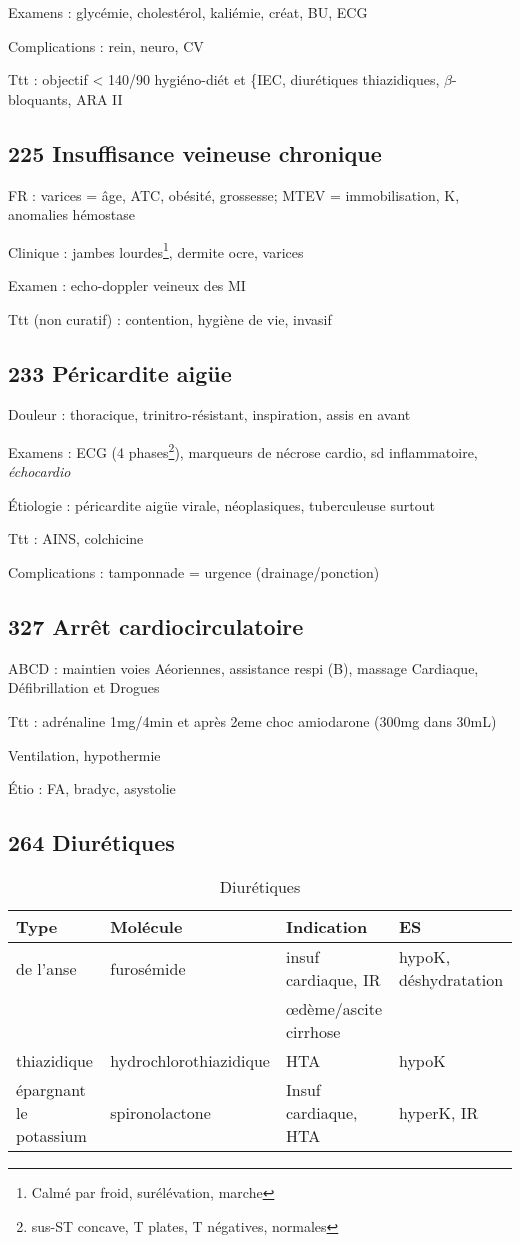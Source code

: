 \documentclass[11pt]{article}
\begin{document}
Examens : glycémie, cholestérol, kaliémie, créat, BU, ECG

Complications : rein, neuro, CV

Ttt : objectif < 140/90 \thus hygiéno-diét et \{IEC, diurétiques thiazidiques, \(\beta\)-bloquants, ARA II
\subsection{225 Insuffisance veineuse chronique}
\label{sec:orgb390963}
FR : varices = âge, ATC, obésité, grossesse; MTEV = immobilisation, K, anomalies hémostase

Clinique : jambes lourdes\footnote{Calmé par froid, surélévation, marche}, dermite ocre, varices

Examen : echo-doppler veineux des MI   

Ttt (non curatif) : contention, hygiène de vie, invasif
\subsection{233 Péricardite aigüe}
\label{sec:orgd1e63e4}
Douleur : thoracique, trinitro-résistant, \inc inspiration, \dec assis en avant

Examens : ECG (4 phases\footnote{sus-ST concave, T plates, T négatives, normales}), marqueurs de nécrose cardio, sd inflammatoire, \emph{échocardio}

Étiologie : péricardite aigüe virale, néoplasiques, tuberculeuse surtout

Ttt : AINS, colchicine

Complications : tamponnade = urgence \faBomb (drainage/ponction)
\subsection{327 Arrêt cardiocirculatoire}
\label{sec:org48763ab}
ABCD : maintien voies Aéoriennes, assistance respi (B), massage Cardiaque,
Défibrillation et Drogues

Ttt : adrénaline 1mg/4min et après 2eme choc amiodarone (300mg dans 30mL)

Ventilation, hypothermie

Étio : FA, bradyc, asystolie
\subsection{264 Diurétiques}
\label{sec:org56886c2}
\begin{table}[htbp]
\caption{Diurétiques}
\centering
\begin{tabular}{llll}
Type & Molécule & Indication & ES\\
\hline
de l'anse & furosémide & insuf cardiaque, IR & hypoK, déshydratation\\
 &  & \oe{}dème/ascite cirrhose & \\
thiazidique & hydrochlorothiazidique & HTA & hypoK\\
épargnant le potassium & spironolactone & Insuf cardiaque, HTA & hyperK, IR\\
\end{tabular}
\end{table}
\end{document}
